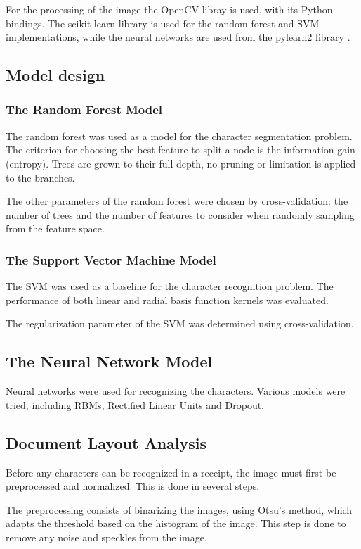 For the processing of the image the OpenCV libray is used, with its Python bindings. The scikit-learn library \cite{pedregosa2011scikit} is used for the random forest and SVM implementations, while the neural networks are used from the pylearn2 library \cite{goodfellow2013pylearn2}. 
\subsection{Model design}

\subsubsection{The Random Forest Model}
The random forest was used as a model for the character segmentation problem. The criterion for choosing the best feature to split a node is the information gain (entropy). Trees are grown to their full depth, no pruning or limitation is applied to the branches. 

The other parameters of the random forest were chosen by cross-validation: the number of trees and the number of features to consider when randomly sampling from the feature space. 

\subsubsection{The Support Vector Machine Model}
The SVM was used as a baseline for the character recognition problem. The performance of both linear and radial basis function kernels was evaluated. 

The regularization parameter of the SVM was determined using cross-validation. 

\subsection{The Neural Network Model}
Neural networks were used for recognizing the characters. Various models were tried, including RBMs, Rectified Linear Units and Dropout. 


\subsection{Document Layout Analysis}
Before any characters can be recognized in a receipt, the image must first be preprocessed and normalized. This is done in several steps. 

The preprocessing consists of binarizing the images, using Otsu's method\cite{otsu1975threshold}, which adapts the threshold based on the histogram of the image. This step is done to remove any noise and speckles from the image. 

